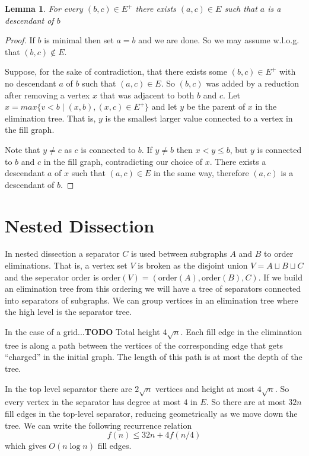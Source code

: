 \documentclass{article}
\newtheorem{lemma}{Lemma}
\begin{document}
\begin{lemma}
    For every $(b, c)\in E^+$ there exists $(a, c)\in E$ such that $a$ is a descendant of $b$
\end{lemma}
\begin{proof}
    If $b$ is minimal then set $a = b$ and we are done.
    So we may assume w.l.o.g. that $(b,c)\notin E$.

    Suppose, for the sake of contradiction, that there exists some $(b, c)\in E^+$ with no descendant $a$ of $b$ such that $(a, c)\in E$.
    So $(b, c)$ was added by a reduction after removing a vertex $x$ that was adjacent to both $b$ and $c$.
    Let $x = max\{v < b\mid (x,b), (x,c)\in E^+\}$ and let $y$ be the parent of $x$ in the elimination tree.
    That is, $y$ is the smallest larger value connected to a vertex in the fill graph.

    Note that $y\neq c$ as $c$ is connected to $b$.
    If $y\neq b$ then $x < y\leq b$, but $y$ is connected to $b$ and $c$ in the fill graph, contradicting our choice of $x$.
    There exists a descendant $a$ of $x$ such that $(a, c)\in E$ in the same way, therefore $(a, c)$ is a descendant of $b$.
\end{proof}

\section{Nested Dissection}

In nested dissection a separator $C$ is used between subgraphs $A$ and $B$ to order eliminations.
That is, a vertex set $V$ is broken as the disjoint union $V = A\sqcup B\sqcup C$ and the seperator order is $\mathrm{order}(V) = (\mathrm{order}(A), \mathrm{order}(B), C)$.
If we build an elimination tree from this ordering we will have a tree of separators connected into separators of subgraphs.
We can group vertices in an elimination tree where the high level is the separator tree.

In the case of a grid...\textbf{TODO}
Total height $4\sqrt{n}$.
Each fill edge in the elimination tree is along a path between the vertices of the corresponding edge that gets ``charged'' in the initial graph.
The length of this path is at most the depth of the tree.

In the top level separator there are $2\sqrt{n}$ vertices and height at most $4\sqrt{n}$.
So every vertex in the separator has degree at most $4$ in $E$.
So there are at most $32 n$ fill edges in the top-level separator, reducing geometrically as we move down the tree.
We can write the following recurrence relation
\[ f(n)\leq 32n + 4 f(n/4) \]
which gives $O(n\log n)$ fill edges.
\end{document}
